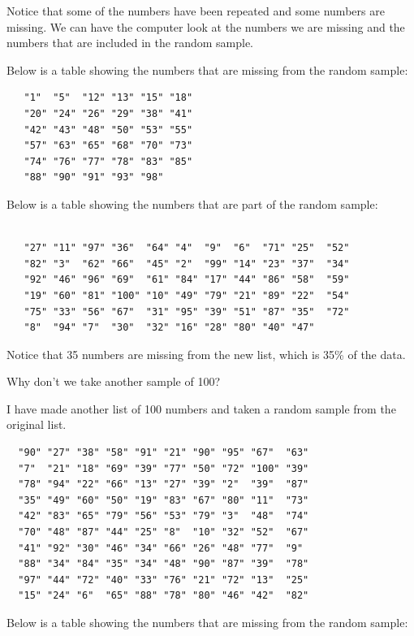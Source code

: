 \documentclass[12pt,twoside]{reedthesis}
\begin{document}
  Notice that some of the numbers have been repeated and some numbers are
  missing. We can have the computer look at the numbers we are missing and
  the numbers that are included in the random sample.
  
  \newpage
  
  Below is a table showing the numbers that are missing from the random
  sample:
  
  \begin{verbatim}
   "1"  "5"  "12" "13" "15" "18"
   "20" "24" "26" "29" "38" "41"
   "42" "43" "48" "50" "53" "55"
   "57" "63" "65" "68" "70" "73"
   "74" "76" "77" "78" "83" "85"
   "88" "90" "91" "93" "98" 
  \end{verbatim}
  
  Below is a table showing the numbers that are part of the random sample:
  
  \begin{verbatim}
  
   "27" "11" "97" "36"  "64" "4"  "9"  "6"  "71" "25"  "52" 
   "82" "3"  "62" "66"  "45" "2"  "99" "14" "23" "37"  "34" 
   "92" "46" "96" "69"  "61" "84" "17" "44" "86" "58"  "59" 
   "19" "60" "81" "100" "10" "49" "79" "21" "89" "22"  "54" 
   "75" "33" "56" "67"  "31" "95" "39" "51" "87" "35"  "72" 
   "8"  "94" "7"  "30"  "32" "16" "28" "80" "40" "47"  
  \end{verbatim}
  
  Notice that 35 numbers are missing from the new list, which is 35\% of
  the data.
  
  Why don't we take another sample of 100?
  
  I have made another list of 100 numbers and taken a random sample from
  the original list.
  
  \begin{verbatim}
  "90" "27" "38" "58" "91" "21" "90" "95" "67"  "63" 
  "7"  "21" "18" "69" "39" "77" "50" "72" "100" "39" 
  "78" "94" "22" "66" "13" "27" "39" "2"  "39"  "87" 
  "35" "49" "60" "50" "19" "83" "67" "80" "11"  "73" 
  "42" "83" "65" "79" "56" "53" "79" "3"  "48"  "74" 
  "70" "48" "87" "44" "25" "8"  "10" "32" "52"  "67" 
  "41" "92" "30" "46" "34" "66" "26" "48" "77"  "9"  
  "88" "34" "84" "35" "34" "48" "90" "87" "39"  "78" 
  "97" "44" "72" "40" "33" "76" "21" "72" "13"  "25" 
  "15" "24" "6"  "65" "88" "78" "80" "46" "42"  "82"
  \end{verbatim}
  
  Below is a table showing the numbers that are missing from the random
  sample:
  
\end{document}
